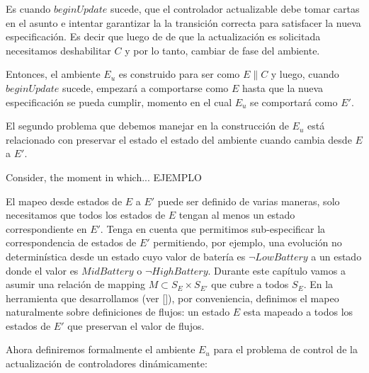 Es cuando $beginUpdate$ sucede, que el controlador actualizable debe tomar cartas en el asunto e intentar garantizar la
la transición correcta para satisfacer la nueva especificación. Es decir que luego de de que la actualización es
solicitada necesitamos deshabilitar $C$ y por lo tanto, cambiar de fase del ambiente.

Entonces, el ambiente $E_u$ es construido para ser como $E\|C$ y luego, cuando $beginUpdate$ sucede, empezará a
comportarse como $E$ hasta que la nueva especificación se pueda cumplir, momento en el cual $E_u$ se comportará como
$E'$.

El segundo problema que debemos manejar en la construcción de $E_u$ está relacionado con preservar el estado el estado
del ambiente cuando cambia desde $E$ a $E'$.

Consider, the moment in which... EJEMPLO

El mapeo desde estados de $E$ a $E'$ puede ser definido de varias maneras, solo necesitamos que todos los estados de $E$
tengan al menos un estado correspondiente en $E'$. Tenga en cuenta que permitimos sub-especificar la correspondencia de
estados de $E'$ permitiendo, por ejemplo, una evolución no determinística desde un estado cuyo valor de batería es
$\lnot LowBattery$ a un estado donde el valor es $MidBattery$ o $\neg HighBattery$. Durante este capítulo vamos a asumir
una relación de mapping $M \subset S_E \times S_{E'}$ que cubre a todos $S_E$. En la herramienta que desarrollamos (ver
\ref{}), por conveniencia, definimos el mapeo naturalmente sobre definiciones de flujos: un estado $E$ esta mapeado a
todos los estados de $E'$ que preservan el valor de flujos.

Ahora definiremos formalmente el ambiente $E_u$ para el problema de control de la actualización de controladores
dinámicamente:

